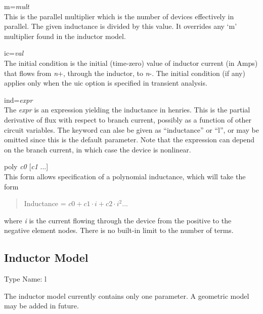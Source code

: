 \begin{description}
\item{\vt m=}{\it mult}\\
This is the parallel multiplier which is the number of devices
effectively in parallel.  The given inductance is divided by this
value.  It overrides any `{\vt m}' multiplier found in the inductor
model.

\item{\vt ic=}{\it val}\\
The initial condition is the initial (time-zero) value of inductor
current (in Amps) that flows from {\it n\/}{\vt +}, through the
inductor, to {\it n\/}{\vt -}.  The initial condition (if any) applies
only when the {\vt uic} option is specified in transient analysis.

\item{\vt ind=}{\it expr}\\
The {\it expr} is an expression yielding the inductance in henries. 
This is the partial derivative of flux with respect to branch current,
possibly as a function of other circuit variables.  The keyword can
alse be given as ``{\vt inductance}'' or ``{\vt l}'', or may be
omitted since this is the default parameter.  Note that the expression
can depend on the branch current, in which case the device is
nonlinear.

\item{\vt poly} {\it c0} [{\it c1} ...]\\
This form allows specification of a polynomial inductance, which will
take the form
\begin{quote}
Inductance = $c0 + c1{\cdot}i + c2{\cdot}i^2 ...$
\end{quote}
where {\it i} is the current flowing through the device from the
positive to the negative element nodes.  There is no built-in limit to
the number of terms.
\end{description}


\subsection{Inductor Model}
\label{indmodel}


{\cb Type Name:} {\vt l}

The inductor model currently contains only one parameter.  A geometric
model may be added in future.

